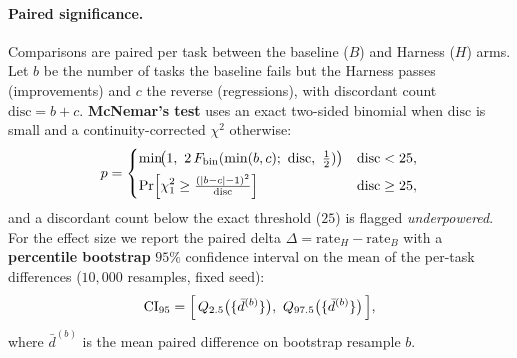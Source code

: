 \documentclass[letterpaper]{article} %
\begin{document}
\paragraph{Paired significance.} Comparisons are paired per task between the baseline ($B$) and
Harness ($H$) arms. Let $b$ be the number of tasks the baseline fails but the Harness passes
(improvements) and $c$ the reverse (regressions), with discordant count $\mathrm{disc}=b+c$.
\textbf{McNemar's test} uses an exact two-sided binomial when $\mathrm{disc}$ is small and a
continuity-corrected $\chi^2$ otherwise:
\begin{equation}
  p =
  \begin{cases}
    \min\!\bigl(1,\ 2\,F_{\mathrm{bin}}(\min(b,c);\ \mathrm{disc},\ \tfrac12)\bigr) & \mathrm{disc} < 25,\\[4pt]
    \displaystyle \Pr\Bigl[\chi^2_1 \ge \tfrac{(|b-c|-1)^2}{\mathrm{disc}}\Bigr] & \mathrm{disc} \ge 25,
  \end{cases}
  \label{eq:mcnemar}
\end{equation}
and a discordant count below the exact threshold ($25$) is flagged \emph{underpowered}. For the
effect size we report the paired delta $\Delta = \mathrm{rate}_H - \mathrm{rate}_B$ with a
\textbf{percentile bootstrap} $95\%$ confidence interval on the mean of the per-task
differences ($10{,}000$ resamples, fixed seed):
\begin{equation}
  \mathrm{CI}_{95} = \Bigl[\,Q_{2.5}\bigl(\{\bar{d}^{(b)}\}\bigr),\ Q_{97.5}\bigl(\{\bar{d}^{(b)}\}\bigr)\,\Bigr],
  \label{eq:bootstrap}
\end{equation}
where $\bar{d}^{(b)}$ is the mean paired difference on bootstrap resample $b$.
\end{document}
